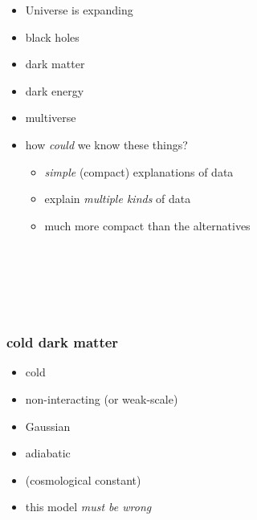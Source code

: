 \documentclass{beamer}
\begin{document}
\begin{frame}
\begin{itemize}
\item Universe is expanding
\item black holes
\item dark matter
\item dark energy
\item multiverse
\item how \emph{could} we know these things?
  \begin{itemize}
  \item \emph{simple} (compact) explanations of data
  \item explain \emph{multiple kinds} of data
  \item much more compact than the alternatives
  \end{itemize}
\end{itemize}
\end{frame}

{\begin{frame}[plain]~\end{frame}}

{\begin{frame}[plain]~\end{frame}}

{\begin{frame}[plain]~\end{frame}}

\begin{frame}
\frametitle{cold dark matter}
\begin{itemize}
\item cold
\item non-interacting (or weak-scale)
\item Gaussian
\item adiabatic
\item (cosmological constant)
\item this model \emph{must be wrong}
\end{itemize}
\end{frame}

{\begin{frame}[plain]~\end{frame}}
\end{document}
